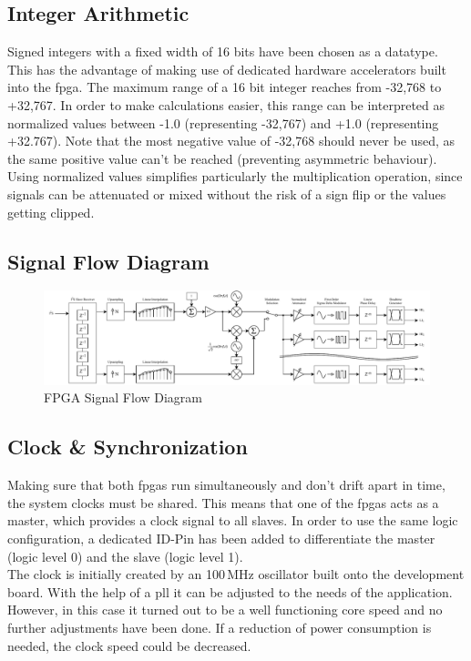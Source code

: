 \subsection{Integer Arithmetic}
Signed integers with a fixed width of 16 bits have been chosen as a datatype. This has the advantage of making use of dedicated hardware accelerators built into the \acrshort{fpga}. The maximum range of a 16 bit integer reaches from -32,768 to +32,767. In order to make calculations easier, this range can be interpreted as normalized values between -1.0 (representing -32,767) and +1.0 (representing +32.767). Note that the most negative value of -32,768 should never be used, as the same positive value can't be reached (preventing asymmetric behaviour).\\
Using normalized values simplifies particularly the multiplication operation, since signals can be attenuated or mixed without the risk of a sign flip or the values getting clipped.
\newpage

\subsection{Signal Flow Diagram}
\enlargethispage{2.6cm}
\begin{figure}[h!]
	\centering
	\includegraphics[width=22.7cm, angle=90]{images/4_Design/FPGA/FPGA Block Diagram.pdf}
	\vspace{-0.2cm}
    \caption{FPGA Signal Flow Diagram}
    \label{fig:fpga-signal-flow}
\end{figure}

\newpage
\subsection{Clock \& Synchronization}
Making sure that both \acrshort{fpga}s run simultaneously and don't drift apart in time, the system clocks must be shared. This means that one of the \acrshort{fpga}s acts as a master, which provides a clock signal to all slaves. In order to use the same logic configuration, a dedicated ID-Pin has been added to differentiate the master (logic level 0) and the slave (logic level 1).\\
The clock is initially created by an 100\,MHz oscillator built onto the development board. With the help of a \acrshort{pll} it can be adjusted to the needs of the application. However, in this case it turned out to be a well functioning core speed and no further adjustments have been done. If a reduction of power consumption is needed, the clock speed could be decreased.

